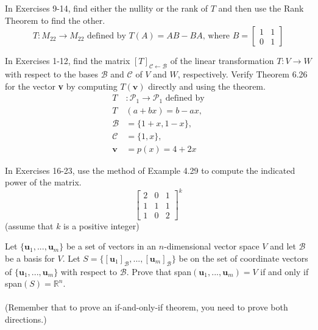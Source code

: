 \documentclass[12pt,letterpaper]{hmcpset}
\newcommand{\RR}{\mathbb{R}}
\newcommand{\m}[1]{\begin{bmatrix} #1 \end{bmatrix}}
\begin{document}
\begin{problem}[Poole 6.5.12]
    In Exercises 9-14, find either the nullity or the rank of $T$ and
    then use the Rank Theorem to find the other.
    \[
        T:M_{22}\to M_{22}\text{ defined by }T(A)=AB-BA\text{, where }
        B=\m{1&1\\0&1}
    \]
\end{problem}
\begin{solution}
    \vfill
\end{solution}
\newpage

\begin{problem}[Poole 6.6.2]
    In Exercises 1-12, find the matrix
    $[T]_{\mathcal{C}\leftarrow\mathcal{B}}$ of the linear
    transformation $T:V\to W$ with respect to the bases $\mathcal{B}$
    and $\mathcal{C}$ of $V$ and $W$, respectively. Verify Theorem
    6.26 for the vector \textbf{v} by computing $T(\textbf{v})$
    directly and using the theorem.
    \begin{align*}
        T&:\mathscr{P}_1\to\mathscr{P}_1\text{ defined by}\\T&(a+bx)=b-ax,\\
        \mathcal{B}&=\{1+x,1-x\},\\\mathcal{C}&=\{1,x\},\\\textbf{v}&=p(x)=4+2x
    \end{align*}
\end{problem}
\begin{solution}
    \vfill
\end{solution}
\newpage

\begin{problem}[Poole 4.4.22]
    In Exercises 16-23, use the method of Example 4.29 to compute the
    indicated power of the matrix.
    \[
        \m{2&0&1\\1&1&1\\1&0&2}^k
    \]
    (assume that $k$ is a positive integer)
\end{problem}
\begin{solution}
    \vfill
\end{solution}
\newpage

\begin{problem}
    Let $\{\textbf{u}_1,...,\textbf{u}_m\}$ be a set of vectors in an
    $n$-dimensional vector space $V$ and let $\mathcal{B}$ be a basis
    for $V$. Let
    $S=\{[\textbf{u}_1]_{\mathcal{B}},...,[\textbf{u}_m]_{\mathcal{B}}\}$
    be on the set of coordinate vectors of
    $\{\textbf{u}_1,...,\textbf{u}_m\}$ with respect to
    $\mathcal{B}$. Prove that span$(\textbf{u}_1,...,\textbf{u}_m)=V$
    if and only if span$(S)=\RR^n$.\\\\
    (Remember that to prove an if-and-only-if theorem, you need to
    prove both directions.)
\end{problem}
\begin{solution}
    \vfill
\end{solution}
\end{document}

